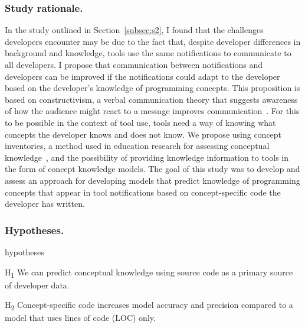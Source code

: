 \documentclass{llncs}
\begin{document}
\subsubsection{Study rationale.}
In the study outlined in Section~\ref{subsec:s2}, I found that the challenges developers encounter may be due to the fact that, despite developer differences in background and knowledge, tools use the same notifications to communicate to all developers. 
I propose that communication between notifications and developers can be improved if the notifications could adapt to the developer based on the developer's knowledge of programming concepts.
This proposition is based on constructivism, a verbal communication theory that suggests awareness of how the audience might react to a message improves communication~\cite{griffin2011first}. For this to be possible in the context of tool use, tools need a way of knowing what concepts the developer knows and does not know. 
We propose using concept inventories, a method used in education research for assessing conceptual knowledge~\cite{tew2010assessing}, and the possibility of providing knowledge information to tools in the form of concept knowledge models. 
The goal of this study was to develop and assess an approach for developing models that predict knowledge of programming concepts that appear in tool notifications based on concept-specific code the developer has written. 

\subsubsection{Hypotheses.}

\begin{labeling}{hypotheses}
	\item [H\textsubscript{1}] We can predict conceptual knowledge using source code as a primary source of developer data.
	\item [H\textsubscript{2}] Concept-specific code increases model accuracy and precision compared to a model that uses lines of code (LOC) only.
\end{labeling}
\end{document}
